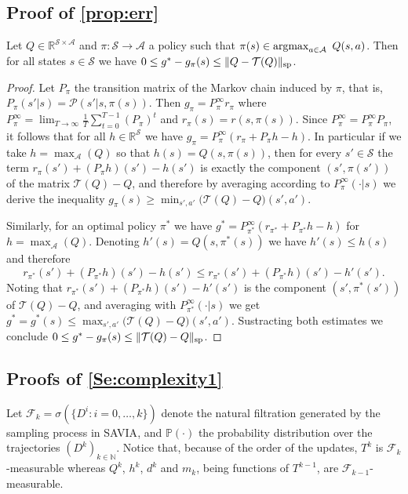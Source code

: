 \documentclass{article}
\newcommand{\Argmax}{\mathop{\rm argmax}}
\newcommand{\cA}{\mathcal{A}}
\newcommand{\cS}{\mathcal{S}}
\newcommand{\cP}{\mathcal{P} }
\newcommand{\prob}{\mathbb{P}}
\newcommand{\T}{\mathcal{T}}
\newcommand{\NN}{\mathbb{N}}
\newcommand{\reals}{\mathbb{R}}
\renewcommand{\sp}[1]{\|{#1}\|_\text{\rm sp}}
\newcommand{\maxA}{\mbox{$\max_\cA$}}
\newcommand{\R}{r}
\newenvironment{manualproposition}[1]{%
  \renewcommand\themanualpropinner{#1}%
  \manualpropinner
}{\endmanualpropinner}
\theoremstyle{plain}
\theoremstyle{definition}
\theoremstyle{remark}
\begin{document}
\subsection{Proof of \cref{prop:err}}
\begin{manualproposition}{\ref{prop:err}}\label{prop:err_appendix}
 Let $Q\in\reals^{\cS\times\cA}$ and $\pi:\cS\to\cA$ a policy such that $\pi(s)\in\Argmax_{a\in\cA}~Q(s,a)$. Then for all states $s\in \cS$ we have $0\leq g^*-g_\pi(s)\leq\sp{Q-\T(Q)}$.
\end{manualproposition}
\begin{proof}
Let $P_\pi$ the transition matrix of the Markov chain induced by $\pi$, that is, $P_\pi(s'|s)=\cP(s'|s,\pi(s))$.
Then $g_\pi=P_\pi^\infty \R_\pi$ where   $P_\pi^\infty=
\lim_{T\to\infty}\frac{1}{T}\sum_{t=0}^{T-1}(P_\pi)^t$ and $\R_\pi(s)=\R(s,\pi(s))$.  Since $P_\pi^\infty=P_\pi^\infty P_\pi$, it follows that for all $h\in\reals^\cS$ we have $g_{\pi}= P_\pi^\infty (\R_\pi+P_\pi h-h)$. In particular if we take $ h=\maxA(Q)$ so that $ h(s)=Q(s,\pi(s))$, then for every $s'\in\cS$ the term
 $\R_\pi(s')+(P_\pi h)(s')- h(s')$ is exactly  the component $(s',\pi(s'))$ of the matrix $\T(Q)-Q$, and therefore by averaging according to $P^\infty_\pi(\cdot|s)$ we derive the inequality $g_\pi(s)\geq \min_{s',a'} \big(\T(Q)-Q\big)(s',a')$.

Similarly, for an optimal policy $\pi^*$ we have $g^*= P_{\pi^*}^\infty (\R_{\pi^*}+P_{\pi^*} h-h)$ for $h=\maxA(Q)$. Denoting $h'(s)=Q(s,\pi^*(s))$ we have $h'(s)\le h(s)$ and therefore 
$$\R_{\pi^*}(s')+(P_{\pi^*} h)(s')-h(s') \le \R_{\pi^*}(s')+(P_{\pi^*} h)(s')-h'(s').$$ 
Noting that $\R_{\pi^*}(s')+(P_{\pi^*} h)(s')-h'(s')$ is the component $(s',\pi^*(s'))$ of $\T(Q)-Q$, and averaging with $P^\infty_{\pi^*}(\cdot|s)$ we get $g^*=g^*(s)\leq \max_{s',a'} \big(\T(Q)-Q\big)(s',a')$.
Sustracting both estimates we conclude $0\leq g^*-g_\pi(s)\leq \sp{\T(Q)-Q}$.
\end{proof}

\subsection{Proofs of \cref{Se:complexity1}}

Let $\mathcal{F}_k=\sigma(\{D^i:i=0,\ldots,k\})$ denote the natural filtration generated by the sampling process in {\rm SAVIA}, and $\prob(\cdot)$ the probability distribution over the trajectories $(D^k)_{k\in\NN}$.
Notice that, because of the order of the updates, $T^k$ is $\mathcal{F}_k$-measurable  whereas $Q^k$, $h^k$, $d^k$ and $m_k$, being functions of $T^{k-1}$, are $\mathcal{F}_{k-1}$-measurable. 
\end{document}
